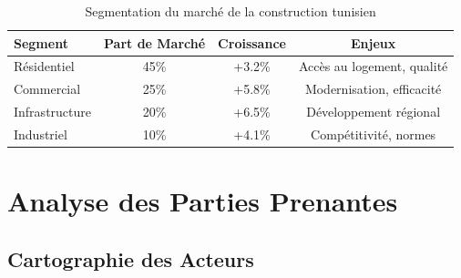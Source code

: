 \documentclass[12pt, a4paper]{report}
\begin{document}
\begin{table}[h]
\centering
\caption{Segmentation du marché de la construction tunisien}
\begin{tabular}{|l|c|c|c|}
\hline
\textbf{Segment} & \textbf{Part de Marché} & \textbf{Croissance} & \textbf{Enjeux} \\
\hline
Résidentiel & 45\% & +3.2\% & Accès au logement, qualité \\
\hline
Commercial & 25\% & +5.8\% & Modernisation, efficacité \\
\hline
Infrastructure & 20\% & +6.5\% & Développement régional \\
\hline
Industriel & 10\% & +4.1\% & Compétitivité, normes \\
\hline
\end{tabular}
\end{table}

\section{Analyse des Parties Prenantes}

\subsection{Cartographie des Acteurs}
\end{document}
